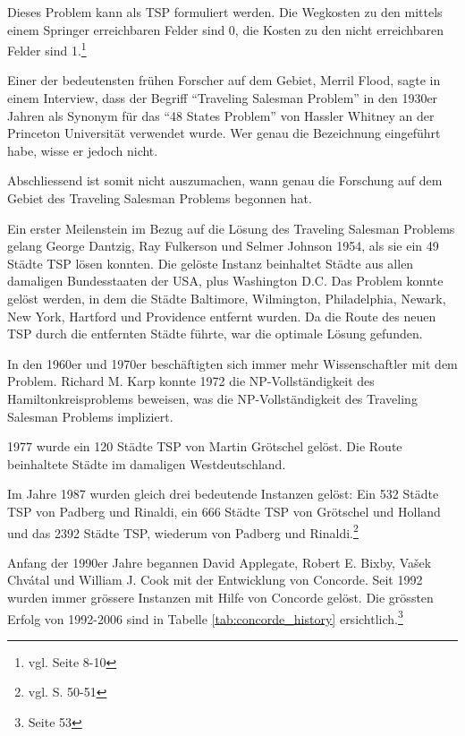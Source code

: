 \documentclass[11pt,a4paper]{article}
\begin{document}
Dieses Problem kann als TSP formuliert werden. Die Wegkosten zu den mittels einem Springer erreichbaren Felder sind 0, die Kosten zu den nicht erreichbaren Felder sind 1.\footnote{vgl. \cite{applegate06} Seite 8-10}

\medskip

Einer der bedeutensten frühen Forscher auf dem Gebiet, Merril Flood, sagte in einem Interview, dass der Begriff "`Traveling Salesman Problem"' in den 1930er Jahren als Synonym für das "`48 States Problem"' von Hassler Whitney an der Princeton Universität verwendet wurde. Wer genau die Bezeichnung eingeführt habe, wisse er jedoch nicht.\cite{interview_merrill_flood84}

Abschliessend ist somit nicht auszumachen, wann genau die Forschung auf dem Gebiet des Traveling Salesman Problems begonnen hat.

\medskip

Ein erster Meilenstein im Bezug auf die Lösung des Traveling Salesman Problems gelang George Dantzig, Ray Fulkerson und Selmer Johnson 1954, als sie ein 49 Städte TSP lösen konnten. Die gelöste Instanz beinhaltet Städte aus allen damaligen Bundesstaaten der USA, plus Washington D.C. Das Problem konnte gelöst werden, in dem die Städte Baltimore, Wilmington, Philadelphia, Newark, New York, Hartford und Providence entfernt wurden. Da die Route des neuen TSP durch die entfernten Städte führte, war die optimale Lösung gefunden.

In den 1960er und 1970er beschäftigten sich immer mehr Wissenschaftler mit dem Problem. Richard M. Karp konnte 1972 die NP-Vollständigkeit des Hamiltonkreisproblems beweisen, was die NP-Vollständigkeit des Traveling Salesman Problems impliziert.

1977 wurde ein 120 Städte TSP von Martin Grötschel gelöst. Die Route beinhaltete Städte im damaligen Westdeutschland.

Im Jahre 1987 wurden gleich drei bedeutende Instanzen gelöst: Ein 532 Städte TSP von Padberg und Rinaldi, ein 666 Städte TSP von Grötschel und Holland und das 2392 Städte TSP, wiederum von Padberg und Rinaldi.\footnote{vgl. \cite{applegate06} S. 50-51}

Anfang der 1990er Jahre begannen David Applegate, Robert E. Bixby, Vašek Chvátal und William J. Cook mit der Entwicklung von Concorde. Seit 1992 wurden immer grössere Instanzen mit Hilfe von Concorde gelöst. Die grössten Erfolg von 1992-2006 sind in Tabelle \ref{tab:concorde_history} ersichtlich.\footnote{\cite{applegate06} Seite 53}
\end{document}
